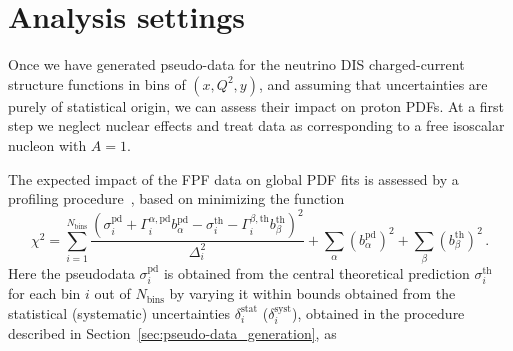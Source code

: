 \clearpage
\section{Analysis settings}
\label{sec:settings}

Once we have generated pseudo-data for the 
neutrino DIS charged-current structure functions
in bins of $(x,Q^2,y)$, and assuming that uncertainties
are purely of statistical origin, we can assess their
impact on proton PDFs.
%
At a first step we neglect nuclear effects
and treat data as corresponding to a free isoscalar
nucleon with $A=1$.

The expected impact of the FPF data on global PDF fits is assessed by a profiling procedure~\cite{Paukkunen:2014zia, Schmidt:2018hvu, AbdulKhalek:2018rok, HERAFitterdevelopersTeam:2015cre}, based on minimizing the function
\begin{equation}
\chi^2 = 
\sum_{i=1}^{N_{\textrm{bins}}} 
\frac{\left(  \sigma_i^{\textrm{pd}}
            + \Gamma_i^{\alpha,\textrm{pd}}
              b_\alpha^{\textrm{pd}}
            - \sigma_i^{\textrm{th}}
            - \Gamma_i^{\beta,\textrm{th}}
              b_\beta^{\textrm{th}}
     \right)^2
     }{\Delta_i^2}
+ \sum_\alpha (b_\alpha^{\textrm{pd}})^2
+ \sum_\beta  (b_\beta^{\textrm{th}})^2 \, .
\label{eq:profilingchi2}
\end{equation}
Here the pseudodata 
$\sigma_i^{\textrm{pd}}$ 
is obtained from the central theoretical prediction 
$\sigma_i^{\textrm{th}}$ 
for each bin $i$ out of $N_{\textrm{bins}}$ by varying it within bounds obtained from the statistical (systematic) uncertainties 
$\delta_i^{\textrm{stat}}$ ($\delta_i^{\textrm{syst}}$), 
obtained in the procedure described in Section~\ref{sec:pseudo-data_generation}, 
as 

